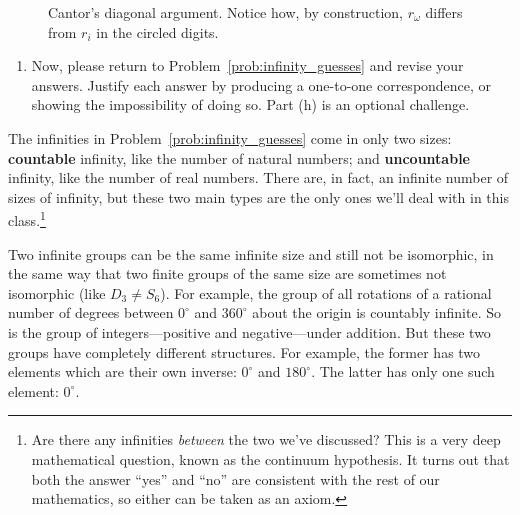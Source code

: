 \documentclass[../textbook.tex]{subfiles}
\begin{document}
\begin{figure}[h]
\begin{center}
\begin{minipage}[b]{\textwidth}
			\vspace*{0.5\baselineskip}
		\end{minipage}
	\end{center}
	\vspace*{-2\baselineskip}
	\begin{center}
		\begin{minipage}[t]{\textwidth}
			\caption{Cantor's diagonal argument. Notice how, by construction, $r_\omega$ differs from $r_i$ in the circled digits.}
			\label{fig:cantor_diag}
		\end{minipage}
	\end{center}
	\vspace*{-2\baselineskip}
\end{figure}

\begin{enumerate}
\setcounter{enumi}{\value{problem_i}}
\item Now, please return to Problem~\ref{prob:infinity_guesses} and revise your answers. Justify each answer by producing a one-to-one correspondence, or showing the impossibility of doing so. Part (h) is an optional challenge.
\setcounter{problem_i}{\value{enumi}}
\end{enumerate}

\noindent The infinities in Problem~\ref{prob:infinity_guesses} come in only two sizes: \textbf{countable} infinity, like the number of natural numbers; and \textbf{uncountable} infinity, like the number of real numbers. There are, in fact, an infinite number of sizes of infinity, but these two main types are the only ones we'll deal with in this class.\footnote{Are there any infinities \textit{between} the two we’ve discussed? This is a very deep mathematical question, known as the continuum hypothesis. It turns out that both the answer ``yes'' and ``no'' are consistent with the rest of our mathematics, so either can be taken as an axiom.}

Two infinite groups can be the same infinite size and still not be isomorphic, in the same way that two finite groups of the same size are sometimes not isomorphic (like $D_3\neq S_6$). For example, the group of all rotations of a rational number of degrees between $0^\circ$ and $360^\circ$ about the origin is countably infinite. So is the group of integers---positive and negative---under addition. But these two groups have completely different structures. For example, the former has two
elements which are their own inverse: $0^\circ$ and $180^\circ$. The latter has only one such element: $0^\circ$.
\end{document}
